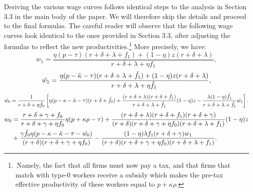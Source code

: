 \documentclass[12pt]{article} %
\theoremstyle{definition}
\begin{document}
\noindent Deriving the various wage curves follows identical steps to the analysis in Section 3.3 in the main body of the paper.
We will therefore skip the details and proceed to the final formulas. The careful reader will observe that the following wage curves look identical to the ones provided in Section 3.3, 
after adjusting the formulas to reflect the new productivities.\footnote{\,Namely, the fact that all firms must now pay a tax, and that firms that match with type-0 workers receive a subsidy which makes the pre-tax effective productivity of these workers equal to $p+\kappa \rho$.} More precisely, we have:    
\begin{equation*}
w_1 = \frac{\eta (p-\tau) (r+\delta+\lambda+f_1)+(1-\eta)z(r+\delta+\lambda)}{r+\delta+\lambda + \eta f_1},  
\end{equation*}
\begin{equation*}
\Tilde{w_1} = \frac{\eta (p-\Tilde{\kappa}-\tau) (r+\delta+\lambda+\tilde{f_1})+(1-\eta)z(r+\delta+\lambda)}{r+\delta+\lambda + \eta \tilde{f_1}},  
\end{equation*}
\begin{equation*} 
\Tilde{w_0} = \frac{1}{r+\delta+\eta \Tilde{f_0}}\left[\eta(p-\kappa-\Tilde{\kappa}-\tau)(r+\delta+ \Tilde{f_0})+\frac{(r+\delta+\lambda)(r+\delta+\Tilde{f_1})}{r+\delta+\lambda+\Tilde{f_1}}(1-\eta)z - \frac{\lambda(1-\eta)\Tilde{f_1}}{r+\delta+\lambda+\Tilde{f_1}}\Tilde{w_1} \right].
\end{equation*}
\begin{equation*}
\begin{split}
w_0 & = \frac{r+\delta+\gamma +f_0}{r+\delta+\gamma+\eta f_0}\eta (p+\kappa \rho -\tau) + \frac{(r+\delta +\lambda)(r+\delta+f_1)(r+\delta+\gamma)}{(r+\delta)(r+\delta+\gamma + \eta f_0)(r+\delta+\lambda+f_1)} (1-\eta) z  \\  
& + \frac{\gamma \Tilde{f_0}\eta(p-\kappa-\Tilde{\kappa}-\tau -\Tilde{w_0})}{(r+\delta)(r+\delta+\gamma + \eta f_0)} - \frac{(1-\eta)\lambda f_1 (r+\delta+\gamma)w_1}{(r+\delta)(r+\delta+\gamma + \eta f_0)(r+\delta+\lambda+f_1)}. 
\end{split}
\end{equation*}
\end{document}
